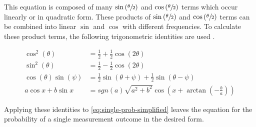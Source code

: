 This equation is composed of many $\sin\left(\sfrac\theta2\right)$ and
$\cos\left(\sfrac\theta2\right)$ terms which occur linearly or in quadratic
form.
These products of $\sin\left(\sfrac\theta2\right)$ and
$\cos\left(\sfrac\theta2\right)$ terms can be combined into linear $\sin$ and
$\cos$ with different frequencies.
To calculate these product terms, the following trigonometric identities are
used \cite{bronstejn_taschenbuch_2016}.

\begin{subequations}
    \label{eq:trigonometric-identities}
    \begin{align}
        \cos^2\left(\theta\right)
            &= \frac12 + \frac12 \cos\left(2\theta\right)
            \label{eq:cos-squared} \\
        \sin^2\left(\theta\right)
            &= \frac12 - \frac12 \cos\left(2\theta\right)
            \label{eq:sin-squared} \\
        \cos\left(\theta\right)\sin\left(\psi\right)
            &= \frac12\sin\left(\theta + \psi\right) + \frac12 \sin\left(\theta - \psi\right)
            \label{eq:cos-sin} \\
        a\cos x + b \sin x
            &= sgn(a) \sqrt{a^2 + b^2} \cos\left(x + \arctan\left(-\frac ba\right)\right)
            \label{eq:cos-sum}
    \end{align}
\end{subequations}

Applying these identities to \autoref{eq:single-prob-simplified} leaves the
equation for the probability of a single measurement outcome in the desired
form.

